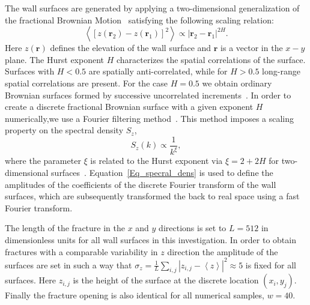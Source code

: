 \documentclass[aps,pre,
superscriptaddress,
twocolumn,
notitlepage,
10pt,
]{revtex4-1}
\begin{document}
The wall surfaces are generated by applying a two-dimensional generalization of
the fractional Brownian Motion~\cite{Oliveira2011, Morais2011, Mandelbrot1968,
	Peitgen2011} satisfying the following scaling relation:
%
\begin{equation} 
\left<\left[z\left(\mathbf{r}_2\right) - 
z\left(\mathbf{r}_1\right)\right]^2 \right> 
\propto \left|\mathbf{r}_2 - \mathbf{r}_1\right|^{2H}. 
\end{equation} 
%
Here $z(\mathbf{r})$ defines the elevation of the wall surface and
$\mathbf{r}$ is a vector in the $x-y$ plane. The Hurst exponent $H$
characterizes the spatial correlations of the surface. Surfaces with
$H<0.5$ are spatially anti-correlated, while for $H>0.5$ long-range spatial
correlations are present. For the case $H=0.5$ we obtain ordinary Brownian
surfaces formed by successive uncorrelated increments~\cite{Peitgen2011}. 
%
In order to create a discrete fractional Brownian surface with a given exponent
$H$ numerically,we use a Fourier filtering method~\cite{Earnshaw1991,
	Peitgen2011}. This method imposes a scaling property on the spectral density
$S_z$,
%
\begin{equation}\label{Eq_specral_dens} 
S_z(k) \propto \frac{1}{k^\xi},
\end{equation} 
%
where the parameter $\xi$ is related to the Hurst exponent via $\xi=2+2H$ for
two-dimensional surfaces~\cite{Hansen2001}. Equation~\ref{Eq_specral_dens} is
used to define the amplitudes of the coefficients of the discrete Fourier
transform of the wall surfaces, which are subsequently transformed the back to
real space using a fast Fourier transform.

The length of the fracture in the $x$ and $y$  directions is set to $L=512$
in dimensionless units for all wall surfaces in this investigation. In
order to obtain fractures with a comparable variability in $z$ direction
the amplitude of the surfaces are set in such a way that 
%
$\sigma_z=\frac{1}{L}\sum_{i,j}\left|z_{i,j}-\left<z\right>\right|^2\approx 5$ 
%
is fixed for all surfaces. Here $z_{i,j}$ is the height of the surface at
the discrete location $\left(x_i,y_j\right)$. Finally the fracture opening
is also identical for all numerical samples, $w=40$.
\end{document}
